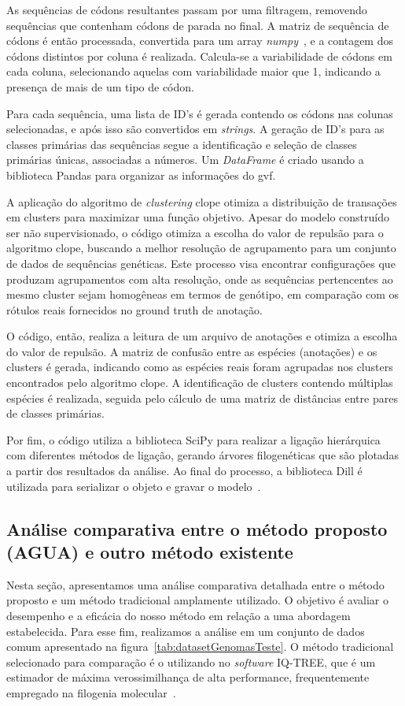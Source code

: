 As sequências de códons resultantes passam por uma filtragem, removendo sequências que contenham códons de parada no final. A matriz de sequência de códons é então processada, convertida para um array \textit{numpy}~\cite{numpy_van_2011}, e a contagem dos códons distintos por coluna é realizada. Calcula-se a variabilidade de códons em cada coluna, selecionando aquelas com variabilidade maior que 1, indicando a presença de mais de um tipo de códon.

Para cada sequência, uma lista de ID's é gerada contendo os códons nas colunas selecionadas, e após isso são convertidos em \textit{strings}. A geração de ID's para as classes primárias das sequências segue a identificação e seleção de classes primárias únicas, associadas a números. Um \textit{DataFrame} é criado usando a biblioteca Pandas para organizar as informações do \gls{gvf}.

A aplicação do algoritmo de \textit{clustering} clope otimiza a distribuição de transações em clusters para maximizar uma função objetivo\cite{clope_yang_2002}. Apesar do modelo construído ser não supervisionado, o código otimiza a escolha do valor de repulsão para o algoritmo clope, buscando a melhor resolução de agrupamento para um conjunto de dados de sequências genéticas. Este processo visa encontrar configurações que produzam agrupamentos com alta resolução, onde as sequências pertencentes ao mesmo cluster sejam homogêneas em termos de genótipo, em comparação com os rótulos reais fornecidos no ground truth de anotação.

O código, então, realiza a leitura de um arquivo de anotações e otimiza a escolha do valor de repulsão. A matriz de confusão entre as espécies (anotações) e os clusters é gerada, indicando como as espécies reais foram agrupadas nos clusters encontrados pelo algoritmo clope. A identificação de clusters contendo múltiplas espécies é realizada, seguida pelo cálculo de uma matriz de distâncias entre pares de classes primárias.

Por fim, o código utiliza a biblioteca SciPy para realizar a ligação hierárquica com diferentes métodos de ligação, gerando árvores filogenéticas que são plotadas a partir dos resultados da análise. Ao final do processo, a biblioteca Dill é utilizada para serializar o objeto e gravar o modelo~\cite{dill}.

\subsection{Análise comparativa entre o método proposto (AGUA) e outro método existente}
Nesta seção, apresentamos uma análise comparativa detalhada entre o método proposto e um método tradicional amplamente utilizado. O objetivo é avaliar o desempenho e a eficácia do nosso método em relação a uma abordagem estabelecida. Para esse fim, realizamos a análise em um conjunto de dados comum apresentado na figura~\ref{tab:datasetGenomasTeste}. O método tradicional selecionado para comparação é o utilizando no \textit{software} IQ-TREE, que é um estimador de máxima verossimilhança de alta performance, frequentemente empregado na filogenia molecular~\cite{iqtree2_minh_2020}.

